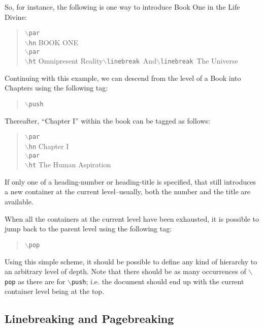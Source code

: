 \documentclass[11pt]{article}
\newcommand{\cmd}[1]{{\tt $\backslash$#1}}
\begin{document}
So, for instance, the following is one way to introduce Book One in
the Life Divine:

\begin{quote}
  \cmd{par}\\
  \cmd{hn} BOOK ONE\\
  \cmd{par}\\
  \cmd{ht} Omnipresent Reality\cmd{linebreak}\ And\cmd{linebreak}\  The Universe
\end{quote}

\noindent Continuing with this example, we can descend from the level of a Book
into Chapters using the following tag:

\begin{quote}
  \cmd{push}
\end{quote}

\noindent Thereafter, ``Chapter I'' within the book can be tagged as follows:

\begin{quote}
  \cmd{par}\\
  \cmd{hn} Chapter I\\
  \cmd{par}\\
  \cmd{ht} The Human Aspiration
\end{quote}

\noindent If only one of a heading-number or heading-title is
specified, that still introduces a new container at the current
level--usually, both the number and the title are available.

When all the containers at the current level have been
exhausted, it is possible to jump back to the parent level using the
following tag:

\begin{quote}
  \cmd{pop}
\end{quote}

Using this simple scheme, it should be possible to define any kind of
hierarchy to an arbitrary level of depth. Note that there should be as
many occurrences of \cmd{pop} as there are for \cmd{push}; i.e. the
document should end up with the current container level being at the
top.

\subsection{Linebreaking and Pagebreaking}


\end{document}
